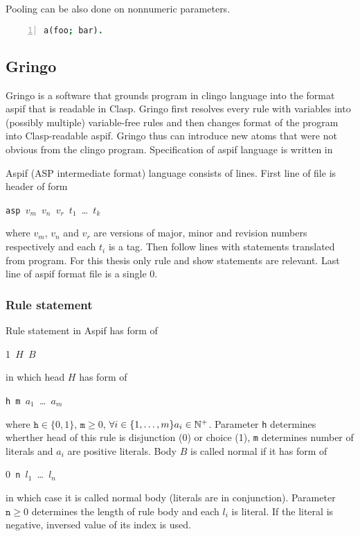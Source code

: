 \documentclass{fithesis}
\begin{document}
Pooling can be also done on nonnumeric parameters.
\begin{lstlisting}[language=prolog, numbers=left, countblanklines=false]
a(foo; bar).
\end{lstlisting}

\subsection{Gringo}

Gringo is a software that grounds program in clingo language into the format
aspif that is readable in Clasp. Gringo first resolves every rule with variables
into (possibly multiple) variable-free rules and then changes format of
the program into Clasp-readable aspif. Gringo thus can introduce new atoms
that were not obvious from the clingo program. Specification of aspif language
is written in %

Aspif (ASP intermediate format) language consists of lines. First line of file
is header of form 
{%
\newcommand{\ms}{\texttt{ }}
\begin{center}
    \texttt{asp}\ms$v_m$\ms$v_n$\ms$v_r$\ms$t_1$\ms\dots\ms$t_k$
\end{center}
}\noindent
where $v_m$, $v_n$ and $v_r$ are versions of major, minor and revision numbers
respectively and each $t_i$ is a tag. Then follow lines with statements
translated from program. For this thesis only rule and show statements
are relevant.
Last line of aspif format file is a single 0.

\subsubsection{Rule statement}

Rule statement in Aspif has form of
{%
\newcommand{\ms}{\texttt{ }}
\begin{center}
    1\ms{}$H$\ms{}$B$
\end{center}
}\noindent
in which head $H$ has form of
{%
\newcommand{\ms}{\texttt{ }}
\begin{center}
    \texttt{h}\ms\texttt{m}\ms$a_1$\ms\dots\ms$a_m$
\end{center}
}\noindent
where $\texttt{h}\in\{0, 1\}$, $\texttt{m}\geq 0$,
$\forall i\in\{1, \dots, m\}a_i\in\mathbb{N}^+$. Parameter \texttt{h} determines
wherther head of this rule is disjunction (0) or choice (1), \texttt{m}
determines number of literals and $a_i$ are positive literals.
Body $B$ is called normal if it has form of
{%
\newcommand{\ms}{\texttt{ }}
\begin{center}
    0\ms\texttt{n}\ms$l_1$\ms\dots\ms$l_n$
\end{center}
}\noindent
in which case it is called normal body (literals are in conjunction).
Parameter $\texttt{n}\geq 0$ determines
the length of rule body and each $l_i$ is literal. If the literal is negative,
inversed value of its index is used.
\end{document}
